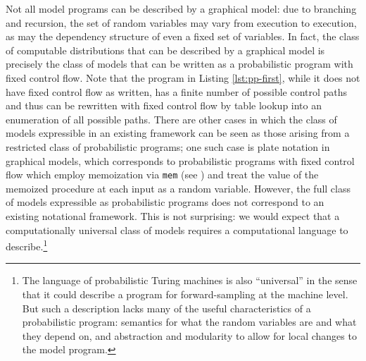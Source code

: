 Not all model programs can be described by a graphical model: due to
branching and recursion, the set of random variables may vary from
execution to execution, as may the dependency structure of even a fixed set
of variables.  In fact, the class of computable distributions that can be
described by a graphical model is precisely the class of models that can be
written as a probabilistic program with fixed control flow.  Note that the
program in Listing \ref{lst:pp-first}, while it does not have fixed control
flow as written, has a finite number of possible control paths and thus can
be rewritten with fixed control flow by table lookup into an enumeration of
all possible paths.  There are other cases in which the class of models
expressible in an existing framework can be seen as those arising from a
restricted class of probabilistic programs; one such case is plate notation
in graphical models, which corresponds to probabilistic programs with fixed
control flow which employ memoization via \texttt{mem} (see
\citep[\S2.1]{goodman2008church}) and treat the value of the memoized procedure at each
input as a random variable.  However, the full class of models expressible as
probabilistic programs does not correspond to an existing notational framework.
This is not surprising: we would expect that a computationally universal class
of models requires a computational language to describe.\footnote{
  The language of probabilistic Turing machines is also ``universal'' in
  the sense that it could describe a program for forward-sampling at the
  machine level.  But such a description lacks many of the useful
  characteristics of a probabilistic program: semantics for what the random
  variables are and what they depend on, and abstraction and modularity to
  allow for local changes to the model program.
}

